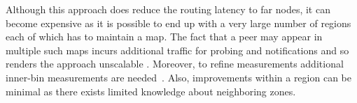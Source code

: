Although this approach does reduce the routing latency to far nodes, it
can become expensive as it is 
possible to end up with a very large number of regions
each of which has to maintain a map. 
The fact that a peer may appear in multiple
such maps incurs additional traffic for probing and notifications
and so renders the approach unscalable \cite{RGJZ2004}. 
Moreover, to refine measurements
additional inner-bin measurements are needed~\cite{WZS2004}.
Also, improvements within a region can be minimal as there exists
limited knowledge about neighboring zones.
%
%
%
%
%
